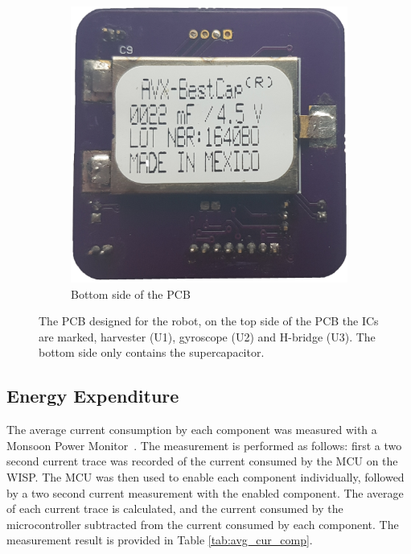 \begin{figure}[h!]
\begin{subfigure}[b]{0.45\textwidth}
		\includegraphics[width=\textwidth]{pics/pcb_back.jpg}
		\caption{Bottom side of the PCB}
		\label{fig:pcb_robot_back}
	\end{subfigure}
	\caption{The PCB designed for the robot, on the top side of the PCB the ICs are marked, harvester (U1), gyroscope (U2) and H-bridge (U3). The bottom side only contains the supercapacitor.}
	\label{fig:pcb_robot}
\end{figure}

\subsection{Energy Expenditure}

The average current consumption by each component was measured with a Monsoon Power Monitor~\cite{monsoon_powermonitor_2017}.
The measurement is performed as follows: first a two second current trace was recorded of the current consumed by the MCU on the WISP.
The MCU was then used to enable each component individually, followed by a two second current measurement with the enabled component.
The average of each current trace is calculated, and the current consumed by the microcontroller subtracted from the current consumed by each component.
The measurement result is provided in Table \ref{tab:avg_cur_comp}.


